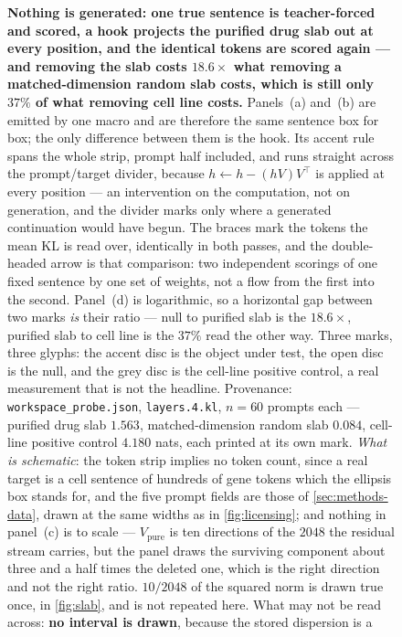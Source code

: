\begin{figure}[htbp]
\begin{fullwidth}
\centering

\caption[The causal measurement]{\textbf{Nothing is generated: one true
sentence is teacher-forced and scored, a hook projects the purified drug slab
out at every position, and the identical tokens are scored again --- and
removing the slab costs $18.6\times$ what removing a matched-dimension random
slab costs, which is still only $37\%$ of what removing cell line costs.}
Panels~(a) and~(b) are emitted by one macro and are therefore the same sentence
box for box; the only difference between them is the hook. Its accent rule
spans the whole strip, prompt half included, and runs straight across the
prompt/target divider, because $h \leftarrow h - (hV)V^{\top}$ is applied at
every position --- an intervention on the computation, not on generation, and
the divider marks only where a generated continuation would have begun. The
braces mark the tokens the mean KL is read over, identically in both passes,
and the double-headed arrow is that comparison: two independent scorings of one
fixed sentence by one set of weights, not a flow from the first into the
second. Panel~(d) is logarithmic, so a horizontal gap between two marks
\emph{is} their ratio --- null to purified slab is the $18.6\times$, purified
slab to cell line is the $37\%$ read the other way. Three marks, three glyphs:
the accent disc is the object under test, the open disc is the null, and the
grey disc is the cell-line positive control, a real measurement that is not the
headline. Provenance: \texttt{workspace\_probe.json}, \texttt{layers.4.kl}, $n
= 60$ prompts each --- purified drug slab $1.563$, matched-dimension random
slab $0.084$, cell-line positive control $4.180$ nats, each printed at its own
mark. \emph{What is schematic}: the token strip implies no token count, since a
real target is a cell sentence of hundreds of gene tokens which the ellipsis
box stands for, and the five prompt fields are those of
\cref{sec:methods-data}, drawn at the same widths as in \cref{fig:licensing};
and nothing in panel~(c) is to scale --- $V_{\textrm{pure}}$ is ten directions
of the $2048$ the residual stream carries, but the panel draws the surviving
component about three and a half times the deleted one, which is the right
direction and not the right ratio. $10/2048$ of the squared norm is drawn true
once, in \cref{fig:slab}, and is not repeated here. What may not be read
across: \textbf{no interval is drawn}, because the stored dispersion is a
}
\end{fullwidth}
\end{figure}
